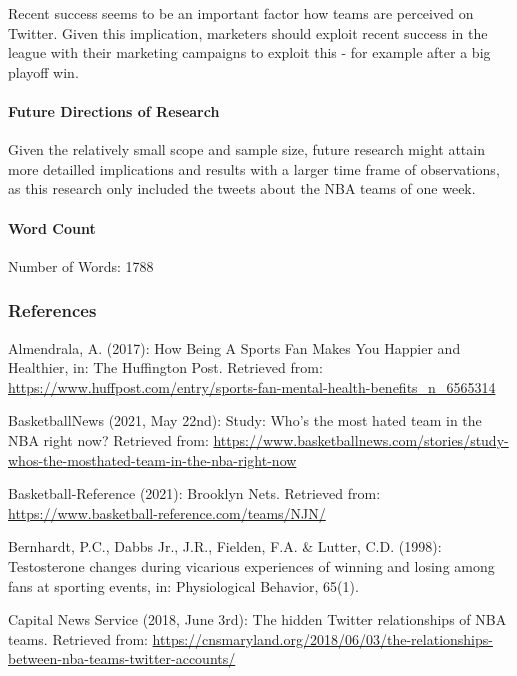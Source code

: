\documentclass[
]{article}
\begin{document}
Recent success seems to be an important factor how teams are perceived
on Twitter. Given this implication, marketers should exploit recent
success in the league with their marketing campaigns to exploit this -
for example after a big playoff win.

\hypertarget{future-directions-of-research}{%
\paragraph{Future Directions of
Research}\label{future-directions-of-research}}

Given the relatively small scope and sample size, future research might
attain more detailled implications and results with a larger time frame
of observations, as this research only included the tweets about the NBA
teams of one week.

\hfill\break

\hypertarget{word-count}{%
\paragraph*{Word Count}\label{word-count}}

Number of Words: 1788

\hypertarget{references}{%
\subsubsection{References}\label{references}}

Almendrala, A. (2017): How Being A Sports Fan Makes You Happier and
Healthier, in: The Huffington Post. Retrieved from:
\url{https://www.huffpost.com/entry/sports-fan-mental-health-benefits_n_6565314}

BasketballNews (2021, May 22nd): Study: Who's the most hated team in the
NBA right now? Retrieved from:
\url{https://www.basketballnews.com/stories/study-whos-the-mosthated-team-in-the-nba-right-now}

Basketball-Reference (2021): Brooklyn Nets. Retrieved from:
\url{https://www.basketball-reference.com/teams/NJN/}

Bernhardt, P.C., Dabbs Jr., J.R., Fielden, F.A. \& Lutter, C.D. (1998):
Testosterone changes during vicarious experiences of winning and losing
among fans at sporting events, in: Physiological Behavior, 65(1).

Capital News Service (2018, June 3rd): The hidden Twitter relationships
of NBA teams. Retrieved from:
\url{https://cnsmaryland.org/2018/06/03/the-relationships-between-nba-teams-twitter-accounts/}
\end{document}

